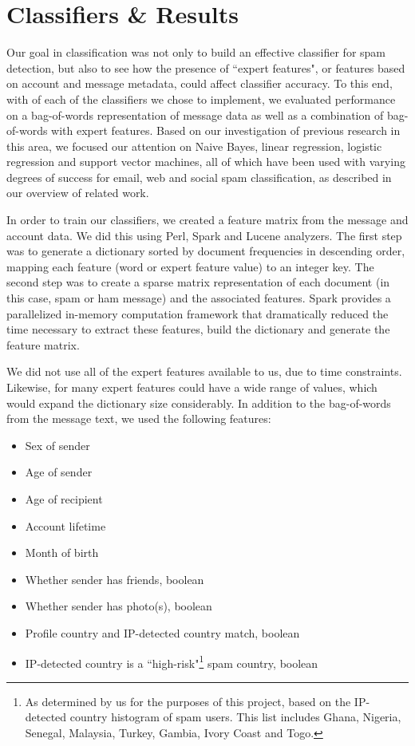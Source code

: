 \documentclass[preprint]{acm_proc_article-sp}
\begin{document}
\section{Classifiers \& Results}

Our goal in classification was not only to build an effective classifier for spam detection, 
but also to see how the presence of ``expert features", or features based on account and 
message metadata, could affect classifier accuracy. To this end, with of each of the classifiers 
we chose to implement, we evaluated performance on a bag-of-words representation of message data 
as well as a combination of bag-of-words with expert features. Based on our investigation of 
previous research in this area, we focused our attention on Naive Bayes, linear regression, 
logistic regression and support vector machines, all of which have been used with varying degrees of 
success for email, web and social spam classification, as described in our overview of related work.

In order to train our classifiers, we created a feature matrix from the message and account data. 
We did this using Perl, Spark and Lucene analyzers. The first step was to generate a dictionary sorted by document 
frequencies in descending order, mapping each feature (word or expert feature value) to an integer 
key. The second step was to create a sparse matrix representation of each document (in this case, 
spam or ham message) and the associated features. Spark provides a parallelized in-memory computation 
framework that dramatically reduced the time necessary to extract these features, build the dictionary 
and generate the feature matrix. 

We did not use all of the expert features available to us, due to time constraints. Likewise, for 
many expert features could have a wide range of values, which would expand the dictionary size 
considerably. In addition to the bag-of-words from the message text, we used the following features:
\begin{itemize}
\item Sex of sender
\item Age of sender
\item Age of recipient
\item Account lifetime
\item Month of birth 
\item Whether sender has friends, boolean
\item Whether sender has photo(s), boolean
\item Profile country and IP-detected country match, boolean
\item IP-detected country is a ``high-risk"\footnote{As determined by us for the purposes of this project, based on 
the IP-detected country histogram of spam users. This list includes Ghana, Nigeria, Senegal, Malaysia, Turkey, 
Gambia, Ivory Coast and Togo.} spam country, boolean
\end{itemize}
\end{document}
